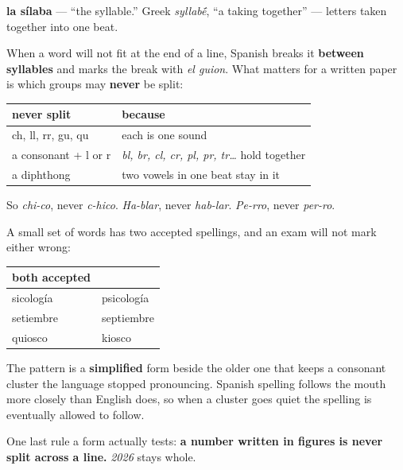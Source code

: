 \begin{cousinweb}
\textbf{la sílaba} — \textquotedblleft{}the syllable.\textquotedblright{} Greek \emph{syllab\'{\={e}}}, \textquotedblleft{}a taking together\textquotedblright{} — letters taken together into one beat.

When a word will not fit at the end of a line, Spanish breaks it \textbf{between syllables} and marks the break with \emph{el guion}. What matters for a written paper is which groups may \textbf{never} be split:

\noindent
\begin{tabularx}{\linewidth}{@{}>{\raggedright\arraybackslash}X>{\raggedright\arraybackslash}X@{}}
\toprule
\textbf{never split} & \textbf{because} \\
\midrule
ch, ll, rr, gu, qu & each is one sound \\
a consonant + l or r & \emph{bl, br, cl, cr, pl, pr, tr…} hold together \\
a diphthong & two vowels in one beat stay in it \\
\bottomrule
\end{tabularx}

So \emph{chi-co}, never \emph{c-hico}. \emph{Ha-blar}, never \emph{hab-lar}. \emph{Pe-rro}, never \emph{per-ro}.
\end{cousinweb}

\begin{grammarlens}[title={Grammar Lens: words Spanish spells two ways}]
A small set of words has two accepted spellings, and an exam will not mark either wrong:

\noindent
\begin{tabularx}{\linewidth}{@{}>{\raggedright\arraybackslash}X>{\raggedright\arraybackslash}X@{}}
\toprule
\textbf{both accepted} & \textbf{} \\
\midrule
sicología & psicología \\
setiembre & septiembre \\
quiosco & kiosco \\
\bottomrule
\end{tabularx}

The pattern is a \textbf{simplified} form beside the older one that keeps a consonant cluster the language stopped pronouncing. Spanish spelling follows the mouth more closely than English does, so when a cluster goes quiet the spelling is eventually allowed to follow.

One last rule a form actually tests: \textbf{a number written in figures is never split across a line.} \emph{2026} stays whole.
\end{grammarlens}

